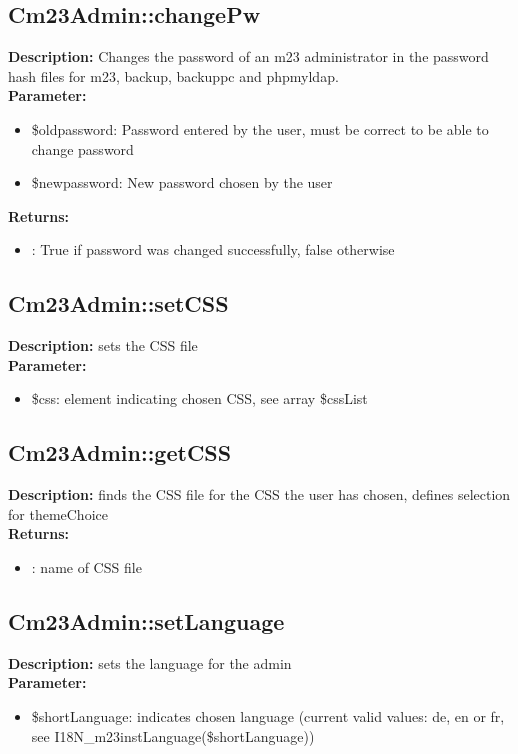 \subsection{Cm23Admin::changePw}
\textbf{Description:} Changes the password of an m23 administrator in the password hash files for m23, backup, backuppc and phpmyldap.\\
\textbf{Parameter:}
\begin{itemize}
\item \$oldpassword: Password entered by the user, must be correct to be able to change password
\item \$newpassword: New password chosen by the user
\end{itemize}
\textbf{Returns:}
\begin{itemize}
\item : True if password was changed successfully, false otherwise
\end{itemize}

\subsection{Cm23Admin::setCSS}
\textbf{Description:} sets the CSS file\\
\textbf{Parameter:}
\begin{itemize}
\item \$css: element indicating chosen CSS, see array \$cssList
\end{itemize}

\subsection{Cm23Admin::getCSS}
\textbf{Description:} finds the CSS file for the CSS the user has chosen, defines selection for themeChoice\\
\textbf{Returns:}
\begin{itemize}
\item : name of CSS file
\end{itemize}

\subsection{Cm23Admin::setLanguage}
\textbf{Description:} sets the language for the admin \\
\textbf{Parameter:}
\begin{itemize}
\item \$shortLanguage: indicates chosen language (current valid values: de, en or fr, see I18N\_m23instLanguage(\$shortLanguage))
\end{itemize}

